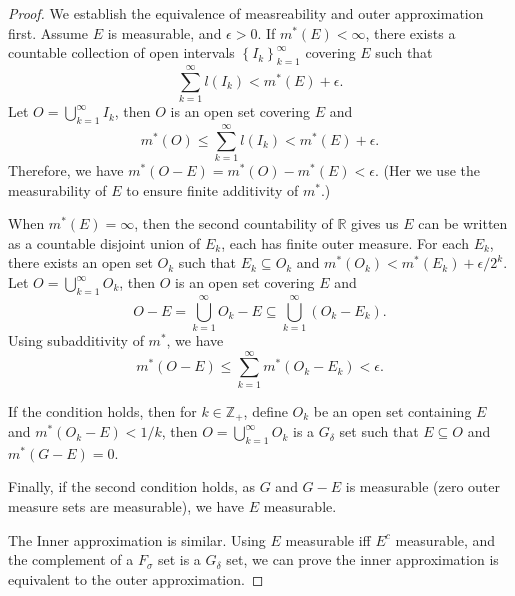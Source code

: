 \documentclass[../main.tex]{subfiles}
\begin{document}
\begin{proof}
	We establish the equivalence of measreability and outer approximation first. Assume $E$ is measurable, and $\epsilon>0$. If $m^*(E)<\infty $, there exists a countable collection of open intervals $\left\{ I_k \right\}_{k=1}^{\infty }$ covering $E$ such that
	\begin{equation*}
		\sum_{k=1}^{\infty } l(I_k) < m^*(E) + \epsilon.
	\end{equation*}
	Let $O = \bigcup_{k=1}^{\infty } I_k$, then $O$ is an open set covering $E$ and
	\begin{equation*}
		m^*(O) \leq \sum_{k=1}^{\infty } l(I_k) < m^*(E) + \epsilon.
	\end{equation*}
	Therefore, we have $m^*(O-E) = m^*(O) - m^*(E) < \epsilon$. (Her we use the measurability of $E$ to ensure finite additivity of $m^*$.)

	When $m^*(E) = \infty $, then the second countability of $\mathbb{R}$ gives us $E$ can be written as a countable disjoint union of $E_k$, each has finite outer measure. For each $E_k$, there exists an open set $O_k$ such that $E_k \subseteq O_k$ and $m^*(O_k) < m^*(E_k) + \epsilon / 2^k$. Let $O = \bigcup_{k=1}^{\infty } O_k$, then $O$ is an open set covering $E$ and
	\begin{equation*}
		O-E = \bigcup_{k=1}^{\infty } O_k - E \subseteq \bigcup_{k=1}^{\infty } (O_k - E_k).
	\end{equation*}
	Using subadditivity of $m^*$, we have
	\begin{equation*}
		m^*(O-E) \leq \sum_{k=1}^{\infty } m^*(O_k - E_k) < \epsilon.
	\end{equation*}

	If the condition holds, then for $k\in \mathbb{Z}_+$, define $O_k$ be an open set containing $E$ and $m^*(O_k-E) < 1 / k$, then $O = \bigcup_{k=1}^{\infty } O_k$ is a $G_{\delta}$ set such that $E \subseteq O$ and $m^*(G-E) = 0$.

	Finally, if the second condition holds, as $G$ and $G-E$ is measurable (zero outer measure sets are measurable), we have $E$ measurable.

	The Inner approximation is similar. Using $E$ measurable iff $E^c$ measurable, and the complement of a $F_{\sigma}$ set is a $G_{\delta}$ set, we can prove the inner approximation is equivalent to the outer approximation.

\end{proof}
\end{document}
